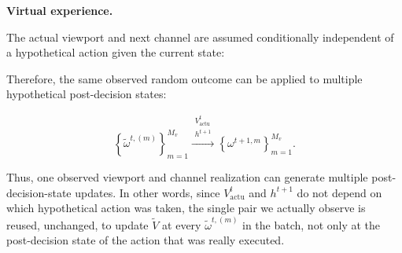 \documentclass[10pt,conference,a4paper]{IEEEtran}
\newcommand{\head}[1]{%
    \vspace{2pt}
    \noindent
    \textbf{#1}
    \hspace{2pt}
}
\begin{document}
\balance

\head{Virtual experience.}
The actual viewport and next channel are assumed conditionally
independent of a hypothetical action given the current state:

Therefore, the same observed random outcome can be applied to
multiple hypothetical post-decision states:

\[
\left\{
\widetilde\omega^{t,(m)}
\right\}_{m=1}^{M_v}
\xrightarrow{
\substack{
V_{\mathrm{actu}}^t\\
h^{t+1}
}
}
\left\{
\omega^{t+1,m}
\right\}_{m=1}^{M_v}.
\]

Thus, one observed viewport and channel realization can generate
multiple post-decision-state updates. In other words, since
$V_{\mathrm{actu}}^t$ and $h^{t+1}$ do not depend on which
hypothetical action was taken, the single pair we actually
observe is reused, unchanged, to update $\widetilde V$ at every
$\widetilde\omega^{t,(m)}$ in the batch, not only at the
post-decision state of the action that was really executed.

\end{document}
